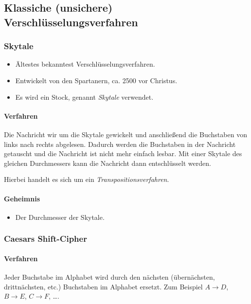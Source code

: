         \subsection{Klassiche (unsichere) Verschlüsselungsverfahren}
            \subsubsection{Skytale} %
                \begin{itemize}
                	\item Ältestes bekanntest Verschlüsselungsverfahren.
                	\item Entwickelt von den Spartanern, ca. 2500 vor Christus.
                	\item Es wird ein Stock, genannt \textit{Skytale} verwendet.
                \end{itemize}
            
                \paragraph{Verfahren}
	                Die Nachricht wir um die Skytale gewickelt und anschließend die Buchstaben von links nach rechts abgelesen. Dadurch werden die Buchstaben in der Nachricht getauscht und die Nachricht ist nicht mehr einfach lesbar. Mit einer Skytale des gleichen Durchmessers kann die Nachricht dann entschlüsselt werden.
	                
	                Hierbei handelt es sich um ein \textit{Transpositionsverfahren}.
                
                \paragraph{Geheimnis}
	                \begin{itemize}
	                	\item Der Durchmesser der Skytale.
	                \end{itemize}

            \subsubsection{Caesars Shift-Cipher}
                \paragraph{Verfahren}
                    Jeder Buchstabe im Alphabet wird durch den nächsten (übernächsten, drittnächsten, etc.) Buchstaben im Alphabet ersetzt. Zum Beispiel \( A \rightarrow D \), \( B \rightarrow E \), \( C \rightarrow F \), \dots.
                    
